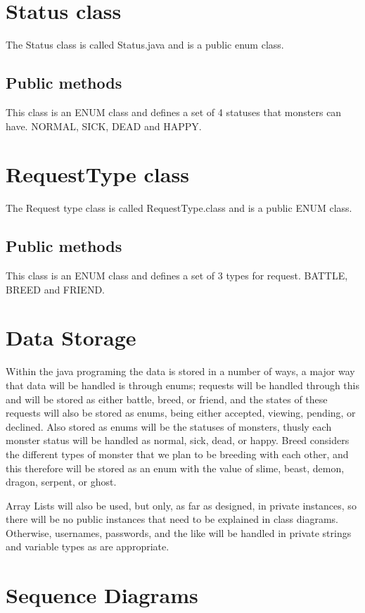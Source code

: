 \documentclass{project}
\begin{document}
\section{Status class}
The Status class is called Status.java and is a public enum class.
\subsection{Public methods}
This class is an ENUM class and defines a set of 4 statuses that monsters can have. NORMAL, SICK, DEAD and HAPPY.


\section{RequestType class}
The Request type class is called RequestType.class and is a public ENUM class.
\subsection{Public methods}
This class is an ENUM class and defines a set of 3 types for request. BATTLE, BREED and FRIEND. 

\section{Data Storage}
Within the java programing the data is stored in a number of ways, a major way that data will be handled is through enums; requests will be handled through this and will be stored as either battle, breed, or friend, and the states of these requests will also be stored as enums, being either accepted, viewing, pending, or declined. Also stored as enums will be the statuses of monsters, thusly each monster status will be handled as normal, sick, dead, or happy.  Breed considers the different types of monster that we plan to be breeding with each other, and this therefore will be stored as an enum with the value of slime, beast, demon, dragon, serpent, or ghost.

Array Lists will also be used, but only, as far as designed, in private instances, so there will be no public instances that need to be explained in class diagrams. Otherwise, usernames, passwords, and the like will be handled in private strings and variable types as are appropriate. 


\section{Sequence Diagrams}
\end{document}
